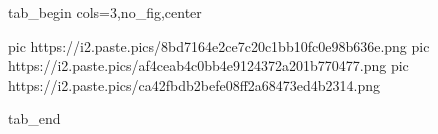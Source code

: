  
 
 
 
 


\ifcmt
  tab_begin cols=3,no_fig,center

     pic https://i2.paste.pics/8bd7164e2ce7c20c1bb10fc0e98b636e.png
		 pic https://i2.paste.pics/af4ceab4c0bb4e9124372a201b770477.png
		 pic https://i2.paste.pics/ca42fbdb2befe08ff2a68473ed4b2314.png

  tab_end
\fi
